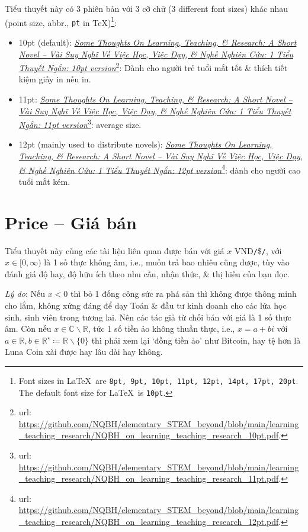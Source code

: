 \documentclass[12pt,twoside]{book}
\begin{document}
Tiểu thuyết này có 3 phiên bản với 3 cỡ chữ (3 different font sizes) khác nhau (point size, abbr., {\tt pt} in \TeX)\footnote{Font sizes in \LaTeX\ are {\tt8pt, 9pt, 10pt, 11pt, 12pt, 14pt, 17pt, 20pt}. The default font size for \LaTeX\ is {\tt10pt}.}:
\begin{itemize}
	\item 10pt (default): \href{https://github.com/NQBH/elementary_STEM_beyond/blob/main/learning_teaching_research/NQBH_on_learning_teaching_research_10pt.pdf}{\it Some Thoughts On Learning, Teaching, \& Research: A Short Novel -- Vài Suy Nghĩ Về Việc Học, Việc Dạy, \& Nghề Nghiên Cứu: 1 Tiểu Thuyết Ngắn: 10pt version}\footnote{{\sc url}: \url{https://github.com/NQBH/elementary_STEM_beyond/blob/main/learning_teaching_research/NQBH_on_learning_teaching_research_10pt.pdf}.}: Dành cho người trẻ tuổi mắt tốt \& thích tiết kiệm giấy in nếu in.
	\item 11pt: \href{https://github.com/NQBH/elementary_STEM_beyond/blob/main/learning_teaching_research/NQBH_on_learning_teaching_research_11pt.pdf}{\it Some Thoughts On Learning, Teaching, \& Research: A Short Novel -- Vài Suy Nghĩ Về Việc Học, Việc Dạy, \& Nghề Nghiên Cứu: 1 Tiểu Thuyết Ngắn: 11pt version}\footnote{{\sc url}: \url{https://github.com/NQBH/elementary_STEM_beyond/blob/main/learning_teaching_research/NQBH_on_learning_teaching_research_11pt.pdf}.}: average size.
	\item 12pt (mainly used to distribute novels): \href{https://github.com/NQBH/elementary_STEM_beyond/blob/main/learning_teaching_research/NQBH_on_learning_teaching_research_12pt.pdf}{\it Some Thoughts On Learning, Teaching, \& Research: A Short Novel -- Vài Suy Nghĩ Về Việc Học, Việc Dạy, \& Nghề Nghiên Cứu: 1 Tiểu Thuyết Ngắn: 12pt version}\footnote{{\sc url}: \url{https://github.com/NQBH/elementary_STEM_beyond/blob/main/learning_teaching_research/NQBH_on_learning_teaching_research_12pt.pdf}.}: dành cho người cao tuổi mắt kém.
\end{itemize}

\section{Price -- Giá bán}
Tiểu thuyết này cùng các tài liệu liên quan được bán với giá $x$ VND{\tt/}\${\tt/}\texteuro, với $x\in[0,\infty)$ là 1 số thực không âm, i.e., muốn trả bao nhiêu cũng được, tùy vào đánh giá độ hay, độ hữu ích theo nhu cầu, nhận thức, \& thị hiếu của bạn đọc.

{\it Lý do}: Nếu $x < 0$ thì bỏ 1 đống công sức ra phá sản thì không được thông minh cho lắm, không xứng đáng để dạy Toán \& đầu tư kinh doanh cho các lứa học sinh, sinh viên trong tương lai. Nên các tác giả từ chối bán với giá là 1 số thực âm. Còn nếu $x\in\mathbb{C}\backslash\mathbb{R}$, tức 1 số tiền ảo không thuần thực, i.e., $x = a + bi$ với $a\in\mathbb{R},b\in\mathbb{R}^\star\coloneqq\mathbb{R}\backslash\{0\}$ thì phải xem lại `đồng tiền ảo' như Bitcoin, hay tệ hơn là Luna Coin xài được hay lâu dài hay không.
\end{document}
